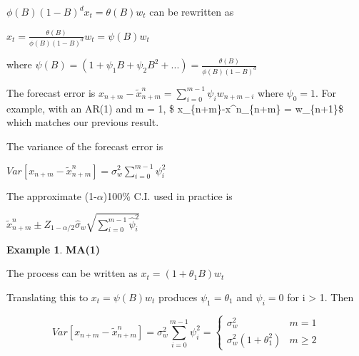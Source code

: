 \documentclass[
]{book}
\theoremstyle{definition}
\theoremstyle{definition}
\newtheorem{example}{Example}[chapter]
\theoremstyle{definition}
\theoremstyle{definition}
\theoremstyle{remark}
\begin{document}
\(\phi(B)(1-B)^dx_t=\theta(B)w_t\) can be rewritten as

\(x_t=\frac{\theta(B)}{\phi(B)(1-B)^d}w_t=\psi(B)w_t\)

where \(\psi(B)=(1+\psi_1B+\psi_2B^2+...)=\frac{\theta(B)}{\phi(B)(1-B)^d}\)

The forecast error is \(x_{n+m}-\tilde x^n_{n+m} = \sum_{i=0}^{m-1}\psi_iw_{n+m-i}\) where \(\psi_0 = 1\). For example, with an AR(1) and m = 1, \$ x\_\{n+m\}-\tilde x\^{}n\_\{n+m\} = w\_\{n+1\}\$ which matches our previous result.

The variance of the forecast error is

\(Var[x_{n+m}-\tilde x^n_{n+m}]=\sigma_w^2\sum_{i=0}^{m-1}\psi_i^2\)

The approximate (1-\(\alpha\))100\% C.I. used in practice is

\(\tilde x^n_{n+m} \pm Z_{1-\alpha/2}\hat\sigma_w\sqrt{\sum_{i=0}^{m-1}\hat \psi_i^2}\)

\begin{example}
\textbf{MA(1)}

The process can be written as \(x_t = (1 + \theta_1B)w_t\)

Translating this to \(x_t = \psi(B)w_t\) produces \(\psi_1 = \theta_1\) and \(\psi_i = 0\) for i \textgreater{} 1. Then

\[Var[x_{n+m}-\tilde x^n_{n+m}]=\sigma_w^2\sum_{i=0}^{m-1}\psi_i^2=\begin{cases} \sigma_w^2 & m=1 \\ \sigma_w^2(1+\theta_1^2) & m \ge 2 \end{cases}\]
\end{example}
\end{document}

